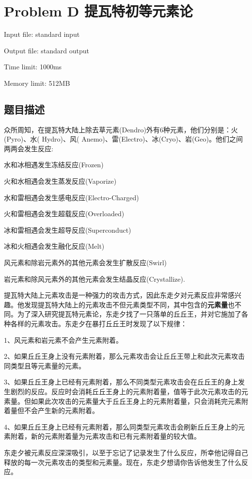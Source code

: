 \newpage
\section{Problem D 提瓦特初等元素论}
{ \limitfont{}
Input file: standard input \par
Output file: standard output \par
Time limit: 1000ms \par
Memory limit: 512MB \par
}
\subsection*{题目描述}

众所周知，在提瓦特大陆上除去草元素(Dendro)外有6种元素，他们分别是：火(Pyro)、水( Hydro)、风( Anemo)、雷(Electro)、冰(Cryo)、岩(Geo)。他们之间两两会发生反应:

水和冰相遇发生冻结反应(Frozen)

火和水相遇会发生蒸发反应(Vaporize)

水和雷相遇会发生感电反应(Electro-Charged)

火和雷相遇会发生超载反应(Overloaded)

冰和雷相遇会发生超导反应(Superconduct)

冰和火相遇会发生融化反应(Melt)

风元素和除岩元素外的其他元素会发生扩散反应(Swirl)

岩元素和除风元素外的其他元素会发生结晶反应(Crystallize).

提瓦特大陆上元素攻击是一种强力的攻击方式，因此东走夕对元素反应非常感兴趣。他发现提瓦特大陆上的元素攻击不但元素类型不同，其中包含的\textbf{元素量}也不同。为了深入研究提瓦特元素论，东走夕找了一只落单的丘丘王，并对它施加了各种各样的元素攻击。东走夕在暴打丘丘王时发现了以下规律：

1、风元素和岩元素不会产生元素附着。

2、如果丘丘王身上没有元素附着，那么元素攻击会让丘丘王带上和此次元素攻击同类型且等元素量的元素。

3、如果丘丘王身上已经有元素附着，那么不同类型元素攻击会在丘丘王的身上发生剧烈的反应。反应时会消耗丘丘王身上的元素附着量，值等于此次元素攻击的元素量。但如果此次攻击的元素量大于丘丘王身上的元素附着量，只会消耗完元素附着量但不会产生新的元素附着。

4、如果丘丘王身上已经有元素附着，那么同类型元素攻击会刷新丘丘王身上的元素附着，新的元素附着量为元素攻击和已有元素附着量的较大值。



东走夕被元素反应深深吸引，以至于忘记了记录发生了什么反应，所幸他记得自己释放的每一次元素攻击的类型和元素量。现在，东走夕想请你告诉他发生了什么反应。

